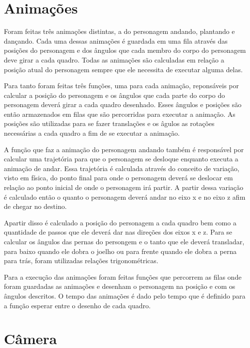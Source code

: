 \documentclass[
	12pt,				%
	openright,			%
	a4paper,			%
	english,			%
	french,				%
	spanish,			%
	brazil,				%
	]{abntex2}
\begin{document}
\section{Animações}
	
Foram feitas três animações distintas, a do personagem andando, plantando e dançando. Cada uma dessas animações é guardada em uma fila através das posições do personagem e dos ângulos que cada membro do corpo do personagem deve girar a cada quadro. Todas as animações são calculadas em relação a posição atual do personagem sempre que ele necessita de executar alguma delas.


Para tanto foram feitas três funções, uma para cada animação, reponsáveis por calcular a posição do personagem e os ângulos que cada parte do corpo do personagem deverá girar a cada quadro desenhado. Esses ângulos e  posições são então armazenados em filas que são percorridas para executar a animação. As posições são utilizadas para se fazer translações e os âgulos as rotações necessárias a cada quadro a fim de se executar a animação.

A função que faz a animação do personagem andando também é responsável por calcular uma trajetória para que o personagem se desloque enquanto executa a animação de andar. Essa trajetória é calculada através do conceito de  variação,  visto em física, do ponto final para onde o personagem deverá se deslocar em relação ao ponto inicial de onde o personagem irá partir. A partir dessa variação é calculado então o quanto o personagem deverá andar no eixo x e no eixo z afim de chegar no destino.

	Apartir disso é calculado a posição do personagem a cada quadro bem como a quantidade de passos que ele deverá dar nas direções dos eixos x e z.
Para se calcular os ângulos das pernas do persongem e o tanto que ele deverá transladar, para baixo quando ele dobra o joelho ou para frente quando ele dobra a perna para trás,  foram utilizadas relações trigonométricas. 

	Para a execução das animações foram feitas funções que percorrem as filas onde foram guardadas as animações e desenham o personagem na posição e com os ângulos descritos. O tempo das animações é dado pelo tempo que é definido para a função esperar entre o desenho de cada quadro.  
	 
\section{Câmera}
\end{document}
